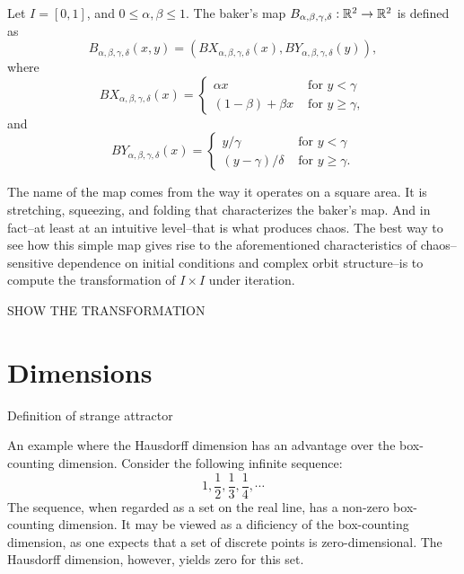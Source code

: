\documentclass[12pt,twoside,draft]{book}
\begin{document}
\begin{definition}
  Let $I = [0,1]$, and $0 \leq \alpha, \beta \leq 1$.
  The baker's map $B_{\alpha, \beta, \gamma, \delta}: \mathbb{R}^2 \to \mathbb{R}^2$ is defined as
  \begin{equation*}
    B_{\alpha, \beta, \gamma, \delta}(x,y) = (BX_{\alpha, \beta, \gamma, \delta}(x), BY_{\alpha, \beta, \gamma, \delta}(y)),
  \end{equation*}
  where
  \begin{equation*}
    BX_{\alpha, \beta, \gamma, \delta}(x) =
     \begin{cases}
      \alpha x  &\mbox{ for } y < \gamma \\
      (1 - \beta) + \beta x  &\mbox{ for } y \geq \gamma,
    \end{cases}
  \end{equation*}
  and
  \begin{equation*}
    BY_{\alpha, \beta, \gamma, \delta}(x) =
     \begin{cases}
       y/\gamma  &\mbox{ for } y < \gamma \\
       (y - \gamma)/ \delta  &\mbox{ for } y \geq \gamma.
    \end{cases}
  \end{equation*}

  \label{defn:baker}
\end{definition}

The name of the map comes from the way it operates on a square area.
It is stretching, squeezing, and folding that characterizes the baker's map.
And in fact--at least at an intuitive level--that is what produces chaos.
The best way to see how this simple map gives rise to the aforementioned characteristics of chaos--sensitive dependence on initial conditions and complex orbit structure--is to compute the transformation of $I \times I$ under iteration.

SHOW THE TRANSFORMATION

\section{Dimensions}
Definition of strange attractor\citep[p.131]{ruelle}

An example where the Hausdorff dimension has an advantage over the box-counting dimension.
Consider the following infinite sequence:
\begin{equation*}
  1, \frac{1}{2}, \frac{1}{3}, \frac{1}{4}, \cdots
\end{equation*}
The sequence, when regarded as a set on the real line, has a non-zero box-counting dimension.
It may be viewed as a dificiency of the box-counting dimension, as one expects that
a set of discrete points is zero-dimensional.
The Hausdorff dimension, however, yields zero for this set.
\end{document}
